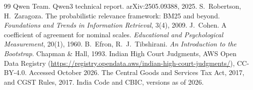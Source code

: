 \documentclass[10pt,a4paper]{article}
\begin{document}
\begin{thebibliography}{99}
 Qwen Team. Qwen3 technical report. arXiv:2505.09388, 2025.
 S.~Robertson, H.~Zaragoza. The probabilistic relevance framework: BM25 and beyond. \emph{Foundations and Trends in Information Retrieval}, 3(4), 2009.
 J.~Cohen. A coefficient of agreement for nominal scales. \emph{Educational and Psychological Measurement}, 20(1), 1960.
 B.~Efron, R.~J.~Tibshirani. \emph{An Introduction to the Bootstrap}. Chapman \& Hall, 1993.
 Indian High Court Judgments, AWS Open Data Registry (\url{https://registry.opendata.aws/indian-high-court-judgments/}), CC-BY-4.0. Accessed October 2026.
 The Central Goods and Services Tax Act, 2017, and CGST Rules, 2017. India Code and CBIC, versions as of 2026.
\end{thebibliography}
\end{document}
